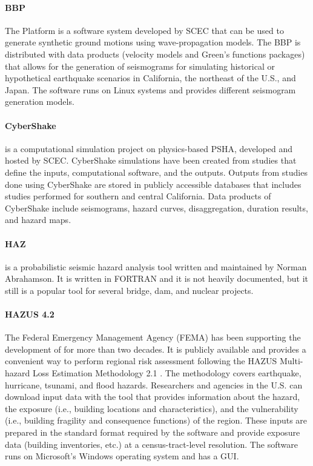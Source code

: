 \paragraph{BBP} The  Platform \citep{maechling2015scec} is a software system developed by SCEC that can be used to generate synthetic ground motions using wave-propagation models. The BBP is distributed with data products (velocity models and Green's functions packages) that allows for the generation of seismograms for simulating historical or hypothetical earthquake scenarios in California, the northeast of the U.S., and Japan. The software runs on Linux systems and provides different seismogram generation models.

\paragraph{CyberShake}  is a computational simulation project on physics-based PSHA, developed and hosted by SCEC. CyberShake simulations have been created from studies that define the inputs, computational software, and the outputs. Outputs from studies done using CyberShake are stored in publicly accessible databases that includes studies performed for southern and central California. Data products of CyberShake include seismograms, hazard curves, disaggregation, duration results, and hazard maps.

\paragraph{HAZ}  is a probabilistic seismic hazard analysis tool written and maintained by Norman Abrahamson. It is written in FORTRAN and it is not heavily documented, but it still is a popular tool for several bridge, dam, and nuclear projects.

\paragraph{HAZUS 4.2} The Federal Emergency Management Agency (FEMA) has been supporting the development of  for more than two decades. It is publicly available and provides a convenient way to perform regional risk assessment following the HAZUS Multi-hazard Loss Estimation Methodology 2.1 \citep{fema2011hurricanetechnical,fema2011earthquaketechnical,fema2011floodtechnical,fema2017tsunamitechnical}. The methodology covers earthquake, hurricane, tsunami, and flood hazards. Researchers and agencies in the U.S. can download input data with the tool that provides information about the hazard, the exposure (i.e., building locations and characteristics), and the vulnerability (i.e., building fragility and consequence functions) of the region. These inputs are prepared in the standard format required by the software and provide exposure data (building inventories, etc.) at a census-tract-level resolution. The software runs on Microsoft's Windows operating system and has a GUI.

